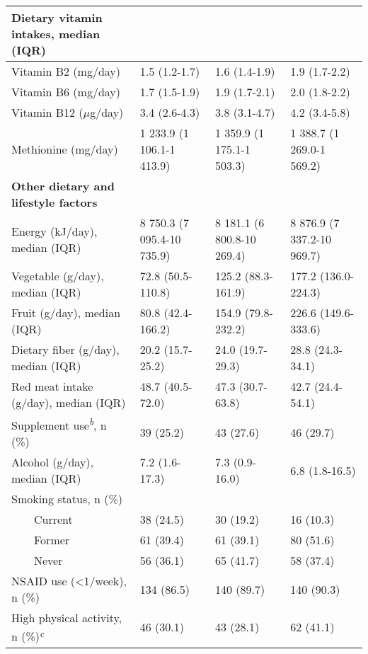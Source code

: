 \begin{flushleft}
\begin{supertabular}{m{4.795cm}m{3.5cm}m{3.5cm}m{3.3cm}}
{\textbf{Dietary vitamin
intakes}}{, median (IQR)} &
~
 &
~
 &
~
\\\hline
 Vitamin B2 (mg/day) &
 1.5 (1.2-1.7) &
 1.6 (1.4-1.9) &
 1.9 (1.7-2.2)\\
 Vitamin B6 (mg/day) &
 1.7 (1.5-1.9) &
 1.9 (1.7-2.1) &
 2.0 (1.8-2.2)\\
 Vitamin B12 ($\mu$g/day) &
 3.4 (2.6-4.3) &
 3.8 (3.1-4.7) &
 4.2 (3.4-5.8)\\
 Methionine (mg/day) &
 1 233.9 (1 106.1-1 413.9) &
 1 359.9 (1 175.1-1 503.3) &
 1 388.7 (1 269.0-1 569.2)\\\hline
\bfseries Other dietary and lifestyle
factors &
~
 &
~
 &
~
\\\hline
 Energy (kJ/day), median (IQR) &
 8 750.3 (7 095.4-10 735.9) &
 8 181.1 (6 800.8-10 269.4) &
 8 876.9 (7 337.2-10 969.7)\\
 Vegetable (g/day), median (IQR) &
 72.8 (50.5-110.8) &
 125.2 (88.3-161.9) &
 177.2 (136.0-224.3)\\
 Fruit (g/day), median (IQR) &
 80.8 (42.4-166.2) &
 154.9 (79.8-232.2) &
 226.6 (149.6-333.6)\\
 Dietary fiber (g/day), median (IQR) &
 20.2 (15.7-25.2) &
 24.0 (19.7-29.3) &
 28.8 (24.3-34.1)\\
 Red meat intake (g/day), median (IQR)
&
 48.7 (40.5-72.0) &
 47.3 (30.7-63.8) &
 42.7 (24.4-54.1)\\
{Supplement
use}{\textit{\textsuperscript{b}}}{,
n (\%)} &
 39 (25.2) &
 43 (27.6) &
 46 (29.7)\\
 Alcohol (g/day), median (IQR) &
 7.2 (1.6-17.3) &
 7.3 (0.9-16.0) &
 6.8 (1.8-16.5)\\
 Smoking status, n (\%) &
~
 &
~
 &
~
\\
 \ \ \ \ Current &
 38 (24.5) &
 30 (19.2) &
 16 (10.3)\\
 \ \ \ \ Former &
 61 (39.4) &
 61 (39.1) &
 80 (51.6)\\
 \ \ \ \ Never &
 56 (36.1) &
 65 (41.7) &
 58 (37.4)\\
 NSAID use ({\textless}1/week), n (\%)
&
 134 (86.5) &
 140 (89.7) &
 140 (90.3)\\
{High
physical activity, n
(\%)}{\textit{\textsuperscript{c}}} &
 46 (30.1) &
 43 (28.1) &
 62 (41.1)\\\hline


\end{supertabular}
\end{flushleft}
